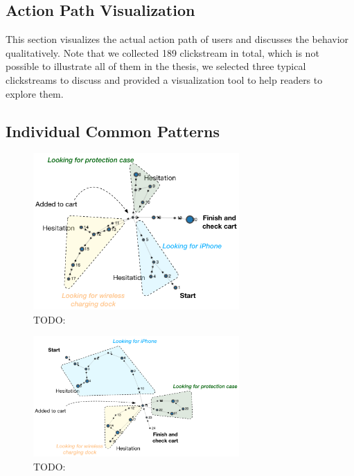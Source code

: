 


\subsection{Action Path Visualization}

This section visualizes the actual action path of users and discusses the behavior qualitatively.
Note that we collected 189 clickstream in total, which is not possible to illustrate all of them
in the thesis, we selected three typical clickstreams to discuss and provided a visualization tool
to help readers to explore them.

\subsection{Individual Common Patterns}

\begin{figure}[H]
    \centering
    \includegraphics[width=0.7\textwidth]{figures/vis-goal1}
    \caption{TODO:}
    \label{fig:vis-goal1}
\end{figure}

\begin{figure}[H]
    \centering
    \includegraphics[width=0.7\textwidth]{figures/vis-goal2}
    \caption{TODO:}
    \label{fig:vis-goal2}
\end{figure}

